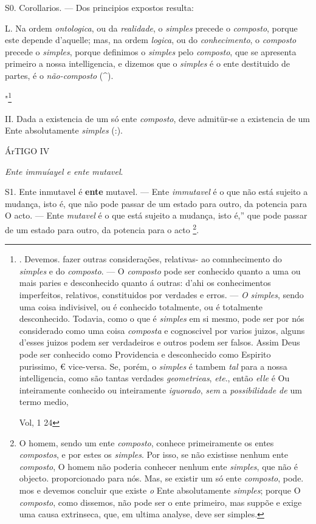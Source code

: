 S0. Corollarios. --- Dos principios expostos resulta:

L. Na ordem \emph{ontologica}, ou da \emph{realidade}, o \emph{simples} precede o \emph{composto}, porque este depende d'aquelle; mas, na ordem \emph{logica}, ou do \emph{conhecimento}, o \emph{composto} precede o \emph{simples}, porque definimos o \emph{simples} pelo \emph{composto}, que se apresenta primeiro a nossa intelligencia, e dizemos que o \emph{simples} é o ente destituido de partes, é o \emph{não-composto} (\textasciicircum{}).

"\footnote{. Devemos. fazer outras considerações, relativas- ao comnhecimento do \emph{simples} e do \emph{composto}. --- O \emph{composto} pode ser conhecido quanto a uma ou mais paries e desconhecido quanto á outras: d'ahi os conhecimentos imperfeitos, relativos, constituidos por verdades e erros. --- \emph{O simples}, sendo uma coisa indivisivel, ou é conhecido totalmente, ou é totalmente desconhecido. Todavia, como o que é \emph{simples} em si mesmo, pode ser por nós considerado como uma coisa \emph{composta} e cognoscivel por varios juizos, alguns d'esses juizos podem ser verdadeiros e outros podem ser falsos. Assim Deus pode ser conhecido como Providencia e desconhecido como Espirito purissimo, € vice-versa. Se, porém, o \emph{simples} é tambem \emph{tal} para a nossa intelligencia, como são tantas verdades \emph{geometrieas}, \emph{ete}., então \emph{elle} é Ou inteiramente conhecido ou inteiramente \emph{iguorado}, \emph{sem} a \emph{possibilidade de} um termo medio,\par Vol, 1 24}

 II. Dada a existencia de um só ente \emph{composto}, deve admitür-se a existencia de um Ente absolutamente \emph{simples} (:).

ÁrTIGO IV

\emph{Ente immuíayel e ente mutavel}.

S1. Ente inmutavel é \textbf{ente} mutavel. --- Ente \emph{immutavel} é o que não está sujeito a mudança, isto é, que não pode passar de um estado para outro, da potencia para O acto. --- Ente \emph{mutavel} é o que está sujeito a mudança, isto é,” que pode passar de um estado para outro, da potencia para o acto \footnote{O homem, sendo um ente \emph{composto}, conhece primeiramente os entes \emph{compostos}, e por estes os \emph{simples}. Por isso, se não existisse nenhum ente \emph{composto}, O homem não poderia conhecer nenhum ente \emph{simples}, que não é objecto. proporcionado para nós. Mas, se existir um só ente \emph{composto}, pode. mos e devemos concluir que existe \emph{o} Ente absolutamente \emph{simples}; porque O \emph{composto}, como dissemos, não pode ser o ente primeiro, mas suppõe e exige uma causa extrinseca, que, em ultima analyse, deve ser simples.}.

